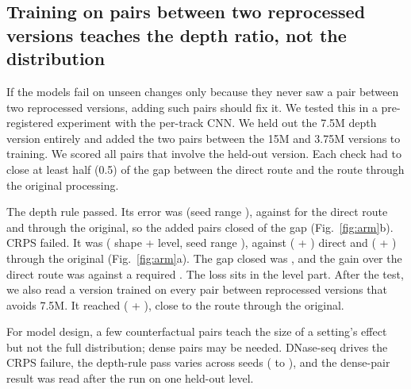 \documentclass[pdflatex,sn-mathphys-num]{sn-jnl}
\newcommand{\lit}[1]{#1}
\begin{document}
\subsection{Training on pairs between two reprocessed versions teaches the depth ratio, not the distribution}\label{sec:r7}

If the models fail on unseen changes only because they never saw a pair between two
reprocessed versions, adding such pairs should fix it. We tested this in a pre-registered
experiment with the per-track CNN. We held out the \lit{7.5}M depth version entirely and added
the two pairs between the \lit{15}M and \lit{3.75}M versions to training. We scored all pairs
that involve the held-out version. Each check had to close at least half (\lit{0.5}) of the gap
between the direct route and the route through the original processing.

The depth rule passed. Its error was \armOneRule{} (seed range \armOneRuleS{}), against
\armRefRule{} for the direct route and \armViaRule{} through the original, so the added pairs
closed \cOneGap{} of the gap (Fig.~\ref{fig:arm}b). CRPS failed. It was \crArm{} (\crArmOS{}
shape + \crArmSE{} level, seed range \crArmS{}), against \crRef{} (\crRefOS{} + \crRefSE{}) direct
and \crVia{} (\crViaOS{} + \crViaSE{}) through the original (Fig.~\ref{fig:arm}a). The gap closed
was \cFourGap{}, and the gain over the direct route was \cFourGainChk{} against a required
\cFourBar{}. The loss sits in the level part. After the test, we also read a version trained on
every pair between reprocessed versions that avoids \lit{7.5}M. It reached \crArmTwo{}
(\crArmTwoOS{} + \crArmTwoSE{}), close to the route through the original.

For model design, a few counterfactual pairs teach the size of a setting's effect but not the
full distribution; dense pairs may be needed. DNase-seq drives the CRPS failure, the depth-rule
pass varies across seeds (\lawSeedLo{} to \lawSeedHi{}), and the dense-pair result was read
after the run on one held-out level.
\end{document}
